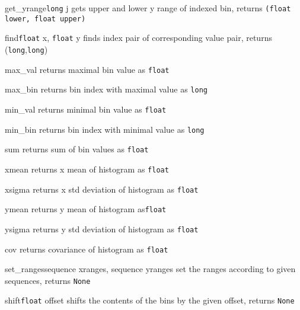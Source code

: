 \begin{methoddesc}{get_yrange}{\texttt{long} j}
gets upper and lower y range of indexed bin,
\hfill returns \texttt{(float \textrm{lower}, float \textrm{upper})}
\end{methoddesc}
\begin{methoddesc}{find}{\texttt{float} x, \texttt{float} y}
finds index pair of corresponding value pair,
\hfill returns (\texttt{long},\texttt{long})
\end{methoddesc}
\begin{methoddesc}{max_val}{}
returns maximal bin value \hfill as \texttt{float}
\end{methoddesc}
\begin{methoddesc}{max_bin}{}
returns bin index with maximal value \hfill as \texttt{long}
\end{methoddesc}
\begin{methoddesc}{min_val}{}
returns minimal bin value \hfill as \texttt{float}
\end{methoddesc}
\begin{methoddesc}{min_bin}{}
returns bin index with minimal value \hfill as \texttt{long}
\end{methoddesc}
\begin{methoddesc}{sum}{}
returns sum of bin values \hfill as \texttt{float}
\end{methoddesc}
\begin{methoddesc}{xmean}{}
returns x mean of histogram \hfill as \texttt{float}
\end{methoddesc}
\begin{methoddesc}{xsigma}{}
returns x std deviation of histogram \hfill as \texttt{float}
\end{methoddesc}
\begin{methoddesc}{ymean}{}
returns y mean of histogram \hfill as\texttt{float}
\end{methoddesc}
\begin{methoddesc}{ysigma}{}
returns y std deviation of histogram \hfill as \texttt{float}
\end{methoddesc}
\begin{methoddesc}{cov}{}
returns covariance of histogram \hfill as \texttt{float}
\end{methoddesc}
\begin{methoddesc}{set_ranges}{sequence xranges, sequence yranges}
set the ranges according to given sequences, \hfill returns \texttt{None}
\end{methoddesc}
\begin{methoddesc}{shift}{\texttt{float} offset}
shifts the contents of the bins by the given offset, \hfill returns \texttt{None}
\end{methoddesc}
